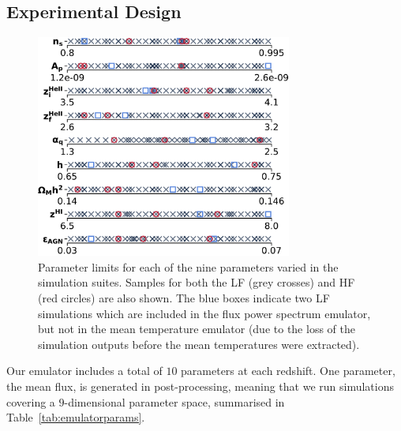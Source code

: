 \documentclass[a4paper,11pt]{article}
\begin{document}


\subsection{Experimental Design}
\label{sec:latinhypercube}

\begin{figure}
    \centering
    \includegraphics[width=0.75\textwidth]{figures/sample_params.pdf}
    \caption{\label{fig:samples}
    Parameter limits for each of the nine parameters varied in the simulation suites.
    Samples for both the LF (grey crosses) and HF (red circles) are also shown.
    The blue boxes indicate two LF simulations which are included in the flux power spectrum emulator, but not in the mean temperature emulator (due to the loss of the simulation outputs before the mean temperatures were extracted).
    }
\end{figure}


Our emulator includes a total of $10$ parameters at each redshift. One parameter, the mean flux, is generated in post-processing, meaning that we run simulations covering a $9$-dimensional parameter space, summarised in Table~\ref{tab:emulatorparams}.
\end{document}
